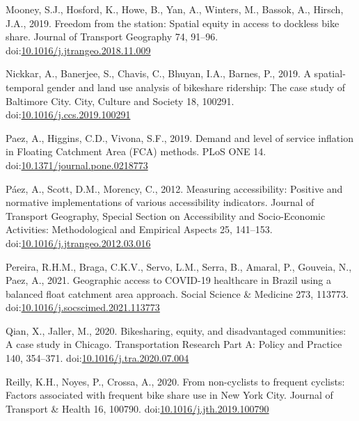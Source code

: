 \documentclass[]{elsarticle} %
\begin{document}
\leavevmode\hypertarget{ref-mooneyFreedomStationSpatial2019}{}%
Mooney, S.J., Hosford, K., Howe, B., Yan, A., Winters, M., Bassok, A.,
Hirsch, J.A., 2019. Freedom from the station: Spatial equity in access
to dockless bike share. Journal of Transport Geography 74, 91--96.
doi:\href{https://doi.org/10.1016/j.jtrangeo.2018.11.009}{10.1016/j.jtrangeo.2018.11.009}

\leavevmode\hypertarget{ref-nickkarSpatialtemporalGenderLand2019}{}%
Nickkar, A., Banerjee, S., Chavis, C., Bhuyan, I.A., Barnes, P., 2019. A
spatial-temporal gender and land use analysis of bikeshare ridership:
The case study of Baltimore City. City, Culture and Society 18, 100291.
doi:\href{https://doi.org/10.1016/j.ccs.2019.100291}{10.1016/j.ccs.2019.100291}

\leavevmode\hypertarget{ref-paezDemandLevelService2019}{}%
Paez, A., Higgins, C.D., Vivona, S.F., 2019. Demand and level of service
inflation in Floating Catchment Area (FCA) methods. PLoS ONE 14.
doi:\href{https://doi.org/10.1371/journal.pone.0218773}{10.1371/journal.pone.0218773}

\leavevmode\hypertarget{ref-paezMeasuringAccessibilityPositive2012}{}%
Páez, A., Scott, D.M., Morency, C., 2012. Measuring accessibility:
Positive and normative implementations of various accessibility
indicators. Journal of Transport Geography, Special Section on
Accessibility and Socio-Economic Activities: Methodological and
Empirical Aspects 25, 141--153.
doi:\href{https://doi.org/10.1016/j.jtrangeo.2012.03.016}{10.1016/j.jtrangeo.2012.03.016}

\leavevmode\hypertarget{ref-pereiraGeographicAccessCOVID192021}{}%
Pereira, R.H.M., Braga, C.K.V., Servo, L.M., Serra, B., Amaral, P.,
Gouveia, N., Paez, A., 2021. Geographic access to COVID-19 healthcare in
Brazil using a balanced float catchment area approach. Social Science \&
Medicine 273, 113773.
doi:\href{https://doi.org/10.1016/j.socscimed.2021.113773}{10.1016/j.socscimed.2021.113773}

\leavevmode\hypertarget{ref-qianBikesharingEquityDisadvantaged2020}{}%
Qian, X., Jaller, M., 2020. Bikesharing, equity, and disadvantaged
communities: A case study in Chicago. Transportation Research Part A:
Policy and Practice 140, 354--371.
doi:\href{https://doi.org/10.1016/j.tra.2020.07.004}{10.1016/j.tra.2020.07.004}

\leavevmode\hypertarget{ref-reillyNoncyclistsFrequentCyclists2020}{}%
Reilly, K.H., Noyes, P., Crossa, A., 2020. From non-cyclists to frequent
cyclists: Factors associated with frequent bike share use in New York
City. Journal of Transport \& Health 16, 100790.
doi:\href{https://doi.org/10.1016/j.jth.2019.100790}{10.1016/j.jth.2019.100790}
\end{document}

